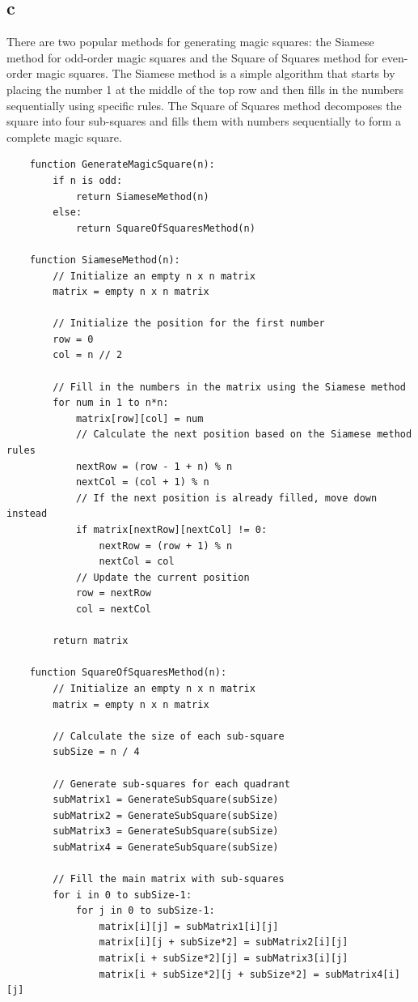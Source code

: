 \documentclass{article}
\begin{document}
\subsection*{c}
There are two popular methods for generating magic squares: the Siamese method for odd-order magic squares and the Square of Squares method for even-order magic squares. The Siamese method is a simple algorithm that starts by placing the number 1 at the middle of the top row and then fills in the numbers sequentially using specific rules. The Square of Squares method decomposes the square into four sub-squares and fills them with numbers sequentially to form a complete magic square.
\begin{verbatim}
    function GenerateMagicSquare(n):
        if n is odd:
            return SiameseMethod(n)
        else:
            return SquareOfSquaresMethod(n)
    
    function SiameseMethod(n):
        // Initialize an empty n x n matrix
        matrix = empty n x n matrix
        
        // Initialize the position for the first number
        row = 0
        col = n // 2
    
        // Fill in the numbers in the matrix using the Siamese method
        for num in 1 to n*n:
            matrix[row][col] = num
            // Calculate the next position based on the Siamese method rules
            nextRow = (row - 1 + n) % n
            nextCol = (col + 1) % n
            // If the next position is already filled, move down instead
            if matrix[nextRow][nextCol] != 0:
                nextRow = (row + 1) % n
                nextCol = col
            // Update the current position
            row = nextRow
            col = nextCol
    
        return matrix
    
    function SquareOfSquaresMethod(n):
        // Initialize an empty n x n matrix
        matrix = empty n x n matrix
    
        // Calculate the size of each sub-square
        subSize = n / 4
    
        // Generate sub-squares for each quadrant
        subMatrix1 = GenerateSubSquare(subSize)
        subMatrix2 = GenerateSubSquare(subSize)
        subMatrix3 = GenerateSubSquare(subSize)
        subMatrix4 = GenerateSubSquare(subSize)
    
        // Fill the main matrix with sub-squares
        for i in 0 to subSize-1:
            for j in 0 to subSize-1:
                matrix[i][j] = subMatrix1[i][j]
                matrix[i][j + subSize*2] = subMatrix2[i][j]
                matrix[i + subSize*2][j] = subMatrix3[i][j]
                matrix[i + subSize*2][j + subSize*2] = subMatrix4[i][j]
    

\end{verbatim}
\end{document}
